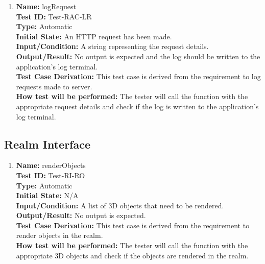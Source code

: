 \documentclass[12pt, titlepage]{article}
\begin{document}
\begin{enumerate}
  \item \textbf{Name:} logRequest \label{itm:Test-RAC-LR} \\
        \textbf{Test ID:} Test-RAC-LR \\
        \textbf{Type:} Automatic \\
        \textbf{Initial State:} An HTTP request has been made. \\
        \textbf{Input/Condition:} A string representing the request details. \\
        \textbf{Output/Result:} No output is expected and the log should be written to the application's log terminal. \\
        \textbf{Test Case Derivation:} This test case is derived from the requirement to log requests made to server. \\
        \textbf{How test will be performed:} The tester will call the function with the appropriate request details and check if the log is written to the application's log terminal. \\

\end{enumerate}

\subsection{Realm Interface}

\begin{enumerate}

  \item \textbf{Name:} renderObjects \label{itm:Test-RI-RO} \\
        \textbf{Test ID:} Test-RI-RO \\
        \textbf{Type:} Automatic \\
        \textbf{Initial State:} N/A \\
        \textbf{Input/Condition:} A list of 3D objects that need to be rendered. \\
        \textbf{Output/Result:} No output is expected. \\
        \textbf{Test Case Derivation:} This test case is derived from the requirement to render objects in the realm. \\
        \textbf{How test will be performed:} The tester will call the function with the appropriate 3D objects and check if the objects are rendered in the realm. \\

\end{enumerate}
\end{document}
